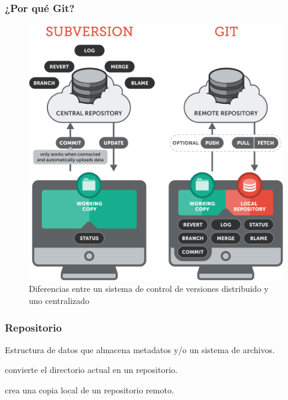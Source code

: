 \documentclass{beamer}
\begin{document}
\begin{frame}
\frametitle{¿Por qué Git?}
\begin{figure}
  \centering
  \includegraphics[scale=0.2]{centralizado-vs-distribuido}
  \caption{Diferencias entre un sistema de control de versiones distribuido y uno centralizado}
\end{figure}
\end{frame}

\begin{frame}
\frametitle{Repositorio}
Estructura de datos que almacena metadatos y/o un sistema de archivos.

\vspace{2em}

\colorbox{purple}{\color{white}{\lstinline|git init|}} convierte el directorio actual en un repositorio.

\vspace{1em}

\colorbox{purple}{\color{white}{\lstinline°git clone <http|ftp|ssh>°}} crea una copia local de un repositorio remoto.
\end{frame}

\begin{frame}
  \begin{center}
    \resizebox{\textwidth}{!}{\FiraTitle \color{green}{git status}}
    \resizebox{0.7\textwidth}{!}{\FiraTitle \color{purple}{git log}}
  \end{center}
\end{frame}
\end{document}
